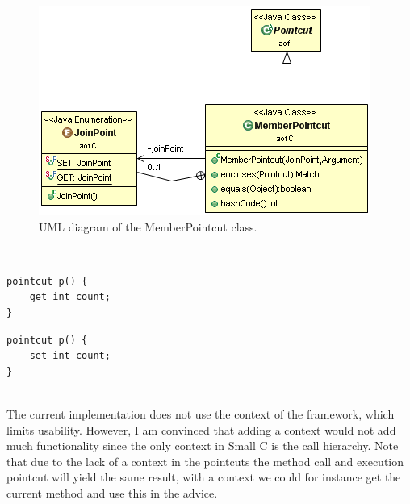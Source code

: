 \documentclass[a4paper]{report}
\begin{document}
\begin{figure}[h!]
\centering
\includegraphics[scale=0.7]{images/AOFC/MemberPointcut.png}
\caption{UML diagram of the MemberPointcut class.}
\label{fig:MemberPointcut}
\end{figure}\\
\begin{minipage}{0.42\textwidth}
\begin{lstlisting}[caption=Example of a member get pointcut., label=lst:SmallC_MemberPointcutGet]
pointcut p() {
	get int count;
}
\end{lstlisting}
\end{minipage}\hfill
\begin{minipage}{0.42\textwidth}
\begin{lstlisting}[caption=Example of a member set pointcut., label=lst:SmallC_MemberPointcutSet]
pointcut p() {
	set int count;
}
\end{lstlisting}
\end{minipage}
\\
The current implementation does not use the context of the framework, which limits usability. However, I am convinced that adding a context would not add much functionality since the only context in Small C is the call hierarchy. Note that due to the lack of a context in the pointcuts the method call and execution pointcut will yield the same result, with a context we could for instance get the current method and use this in the advice.
\end{document}
